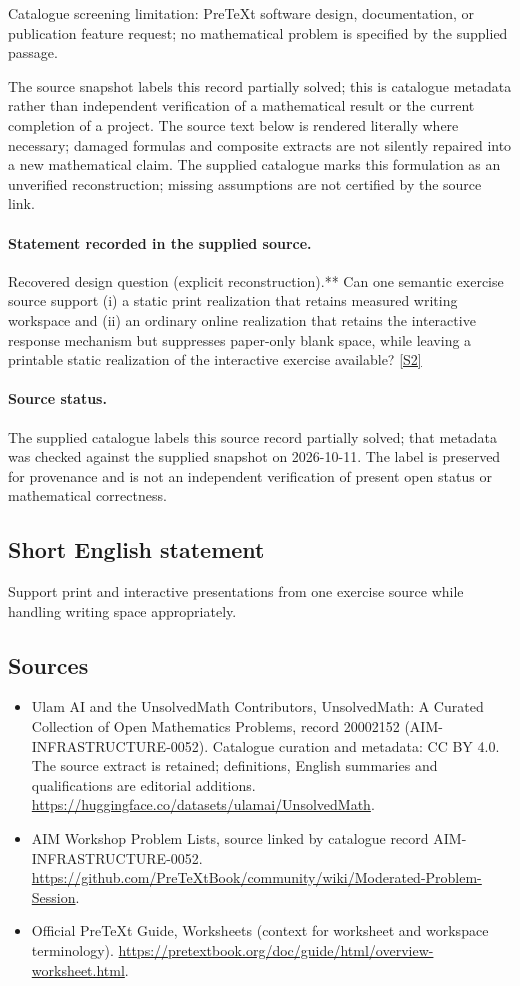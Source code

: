 \documentclass[11pt]{article}
\begin{document}
Catalogue screening limitation: PreTeXt software design, documentation, or publication feature request; no mathematical problem is specified by the supplied passage.

The source snapshot labels this record partially solved; this is catalogue metadata rather than independent verification of a mathematical result or the current completion of a project.
The source text below is rendered literally where necessary; damaged formulas and composite extracts are not silently repaired into a new mathematical claim.
The supplied catalogue marks this formulation as an unverified reconstruction; missing assumptions are not certified by the source link.
\paragraph{Statement recorded in the supplied source.}
Recovered design question (explicit reconstruction).** Can one semantic exercise source support (i) a static print realization that retains measured writing workspace and (ii) an ordinary online realization that retains the interactive response mechanism but suppresses paper-only blank space, while leaving a printable static realization of the interactive exercise available? \href{https://github.com/PreTeXtBook/community/wiki/Moderated-Problem-Session}{[S2]}
\paragraph{Source status.}
The supplied catalogue labels this source record partially solved; that metadata was checked against the supplied snapshot on 2026-10-11. The label is preserved for provenance and is not an independent verification of present open status or mathematical correctness.
\subsection{Short English statement}
Support print and interactive presentations from one exercise source while handling writing space appropriately.
\subsection{Sources}
\begin{itemize}
\item[S1] Ulam AI and the UnsolvedMath Contributors, UnsolvedMath: A Curated Collection of Open Mathematics Problems, record 20002152 (AIM-INFRASTRUCTURE-0052). Catalogue curation and metadata: CC BY 4.0. The source extract is retained; definitions, English summaries and qualifications are editorial additions.
\url{https://huggingface.co/datasets/ulamai/UnsolvedMath}.
\item[S2] AIM Workshop Problem Lists, source linked by catalogue record AIM-INFRASTRUCTURE-0052.
\url{https://github.com/PreTeXtBook/community/wiki/Moderated-Problem-Session}.
\item[S3] Official PreTeXt Guide, Worksheets (context for worksheet and workspace terminology).
\url{https://pretextbook.org/doc/guide/html/overview-worksheet.html}.
\end{itemize}
\end{document}
